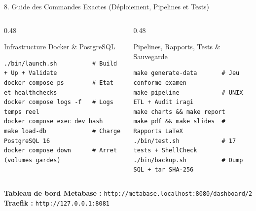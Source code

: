 \documentclass[aspectratio=169,10pt]{beamer}
\begin{document}
\begin{frame}[fragile]{8. Guide des Commandes Exactes (D\'eploiement, Pipelines et Tests)}
    \begin{columns}[T]
        \begin{column}{0.48\textwidth}
            \begin{block}{Infrastructure Docker \& PostgreSQL}
\scriptsize
\begin{verbatim}
./bin/launch.sh          # Build + Up + Validate
docker compose ps        # Etat et healthchecks
docker compose logs -f   # Logs temps reel
docker compose exec dev bash
make load-db             # Charge PostgreSQL 16
docker compose down      # Arret (volumes gardes)
\end{verbatim}
            \end{block}
        \end{column}
        \begin{column}{0.48\textwidth}
            \begin{exampleblock}{Pipelines, Rapports, Tests \& Sauvegarde}
\scriptsize
\begin{verbatim}
make generate-data       # Jeu conforme examen
make pipeline            # UNIX ETL + Audit iragi
make charts && make report
make pdf && make slides  # Rapports LaTeX
./bin/test.sh            # 17 tests + ShellCheck
./bin/backup.sh          # Dump SQL + tar SHA-256
\end{verbatim}
            \end{exampleblock}
        \end{column}
    \end{columns}
    \vspace{0.18cm}
    \centering
    \footnotesize\textbf{Tableau de bord Metabase :} \texttt{http://metabase.localhost:8080/dashboard/2} \hspace{0.4cm} \textbf{Traefik :} \texttt{http://127.0.0.1:8081}
\end{frame}
\end{document}
